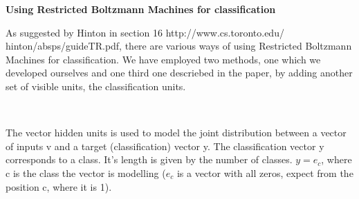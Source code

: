 \documentclass{letter}
\newcommand{\tmtextbf}[1]{{\bfseries{#1}}}
\begin{document}
\tmtextbf{Using Restricted Boltzmann Machines for classification}

As suggested by Hinton in section 16 http://www.cs.toronto.edu/\~{
}hinton/absps/guideTR.pdf, there are various ways of using Restricted
Boltzmann Machines for classification. We have employed two methods, one which
we developed ourselves and one third one descriebed in the paper, by adding
another set of visible units, the classification units.



\ \ \ \ \ \ \ \ \ \ \ \ \ \ \ \ \ \ \ \ \ \ \ \ \ \ \ \ \ \ \ \ \ \

The vector hidden units is used to model the joint distribution between a
vector of inputs v and a target (classification) vector y. The classification
vector y corresponds to a class. It's length is given by the number of
classes. $y = e_c$, where c is the class the vector is modelling ($e_c$ is a
vector with all zeros, expect from the position c, where it is 1).
\end{document}
